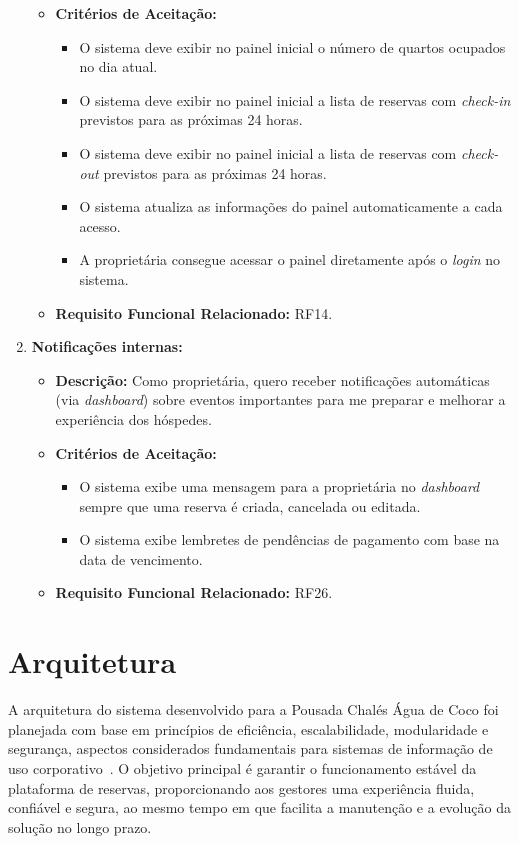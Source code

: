 \documentclass[
	12pt,				%
	openany,			%
	oneside,			%
	a4paper,			%
	english,			%
	french,				%
	spanish,			%
	brazil				%
	]{abntex2}
\begin{document}
\begin{enumerate}[label=\textbf{\arabic*.}]
\begin{itemize}
		\item \textbf{Critérios de Aceitação:}
		\begin{itemize}
			\item O sistema deve exibir no painel inicial o número de quartos ocupados no dia atual.
			\item O sistema deve exibir no painel inicial a lista de reservas com \textit{check-in} previstos para as próximas 24 horas.
			\item O sistema deve exibir no painel inicial a lista de reservas com \textit{check-out} previstos para as próximas 24 horas.
			\item O sistema atualiza as informações do painel automaticamente a cada acesso.
			\item A proprietária consegue acessar o painel diretamente após o \textit{login} no sistema.
		\end{itemize}
		\item \textbf{Requisito Funcional Relacionado:} RF14.
	\end{itemize} 
	\item \textbf{Notificações internas:}
	\begin{itemize}
		\item \textbf{Descrição:} Como proprietária, quero receber notificações automáticas (via \textit{dashboard}) sobre eventos importantes para me preparar e melhorar a experiência dos hóspedes.
		\item \textbf{Critérios de Aceitação:}
		\begin{itemize}
			\item O sistema exibe uma mensagem para a proprietária no \textit{dashboard} sempre que uma reserva é criada, cancelada ou editada.
			\item O sistema exibe lembretes de pendências de pagamento com base na data de vencimento.
		\end{itemize}
		\item \textbf{Requisito Funcional Relacionado:} RF26.
	\end{itemize} 
\end{enumerate}

\section{Arquitetura}

A arquitetura do sistema desenvolvido para a Pousada Chalés Água de Coco foi planejada com base em princípios de eficiência, escalabilidade, modularidade e segurança, aspectos considerados fundamentais para sistemas de informação de uso corporativo~\cite{pressman, sommerville}. O objetivo principal é garantir o funcionamento estável da plataforma de reservas, proporcionando aos gestores uma experiência fluida, confiável e segura, ao mesmo tempo em que facilita a manutenção e a evolução da solução no longo prazo.
\end{document}

